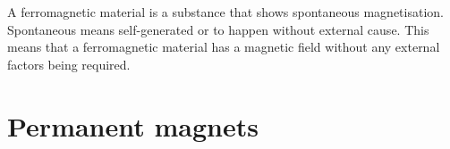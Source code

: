      \label{m37830*id128668}A ferromagnetic material is a substance that shows spontaneous magnetisation. Spontaneous means self-generated or to happen without external cause. This means that a ferromagnetic material has a magnetic field without any external factors being required.
    \section*{Permanent magnets}
            \nopagebreak
      \label{m37830*uid16}
